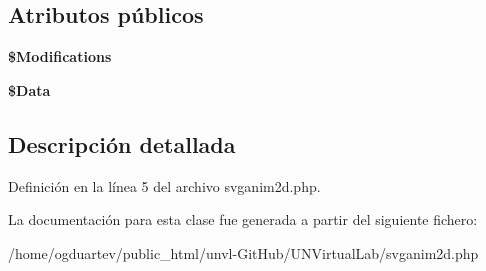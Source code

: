 \subsection*{Atributos públicos}
\begin{DoxyCompactItemize}
\item 
\mbox{\label{classanimation2dSVG_a92cc9fb81ca29815fa76edc77d08e59c}} 
{\bfseries \$\+Modifications}
\item 
\mbox{\label{classanimation2dSVG_a728b33062ec679ebba4d1fc087658a51}} 
{\bfseries \$\+Data}
\end{DoxyCompactItemize}


\subsection{Descripción detallada}


Definición en la línea 5 del archivo svganim2d.\+php.



La documentación para esta clase fue generada a partir del siguiente fichero\+:\begin{DoxyCompactItemize}
\item 
/home/ogduartev/public\+\_\+html/unvl-\/\+Git\+Hub/\+U\+N\+Virtual\+Lab/svganim2d.\+php\end{DoxyCompactItemize}
